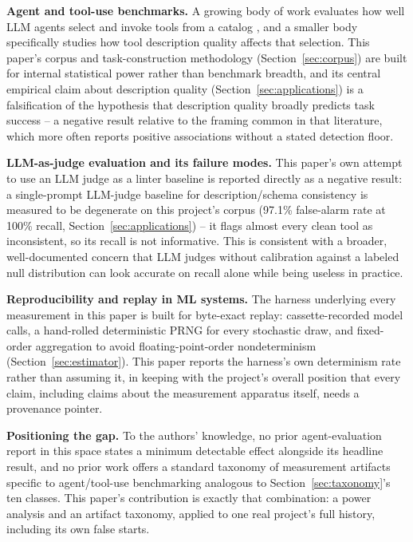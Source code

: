 \documentclass[11pt]{article}
\begin{document}
\textbf{Agent and tool-use benchmarks.} A growing body of work evaluates how well LLM agents
select and invoke tools from a catalog \citep{qin2023toolllm,li2023apibank,yu2026wildtool}, and a
smaller body specifically studies how tool
description quality affects that selection. This paper's corpus and task-construction methodology
(Section~\ref{sec:corpus}) are built for internal statistical power rather than benchmark breadth,
and its central empirical claim about description quality (Section~\ref{sec:applications}) is a
falsification of the hypothesis that description quality broadly predicts task success -- a
negative result relative to the framing common in that literature, which more often reports
positive associations without a stated detection floor.

\textbf{LLM-as-judge evaluation and its failure modes.} This paper's own attempt to use an LLM
judge as a linter baseline is reported directly as a negative result: a single-prompt LLM-judge
baseline for description/schema consistency is measured to be degenerate on this project's corpus
(97.1\% false-alarm rate at 100\% recall, Section~\ref{sec:applications})
-- it flags almost every
clean tool as inconsistent, so its recall is not informative. This is consistent with a broader,
well-documented concern \citep{zheng2023judging} that LLM judges without calibration against a
labeled null distribution
can look accurate on recall alone while being useless in practice.

\textbf{Reproducibility and replay in ML systems.} The harness underlying every measurement in
this paper is built for byte-exact replay: cassette-recorded model calls, a hand-rolled
deterministic PRNG for every stochastic draw, and fixed-order aggregation to avoid
floating-point-order nondeterminism (Section~\ref{sec:estimator}). This paper reports the harness's
own determinism rate rather than assuming it, in keeping with the project's overall position that
every claim, including claims about the measurement apparatus itself, needs a provenance pointer.

\textbf{Positioning the gap.} To the authors' knowledge, no prior agent-evaluation report in this
space states a minimum detectable effect alongside its headline result, and no prior work offers a
standard taxonomy of measurement artifacts specific to agent/tool-use benchmarking analogous to
Section~\ref{sec:taxonomy}'s ten classes. This paper's contribution is exactly that combination:
a power analysis and an artifact taxonomy, applied to one real project's full history, including
its own false starts.
\end{document}
